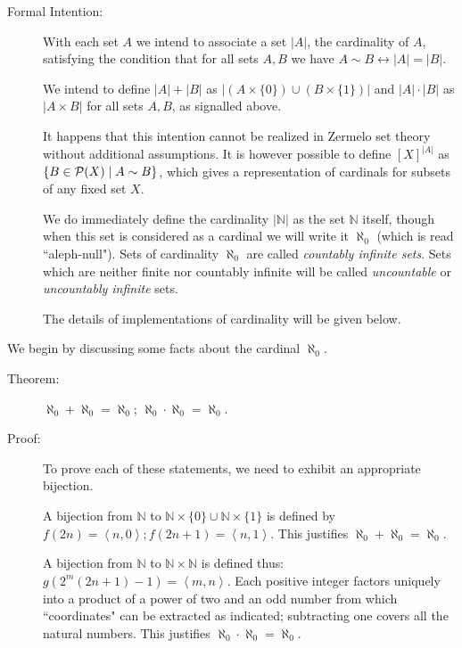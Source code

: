 \documentclass[12pt]{book}
\begin{document}
\begin{description}

\item[Formal Intention:]  With each set $A$ we intend to associate a set $|A|$, the cardinality of $A$, satisfying the condition that for
all sets $A,B$ we have $A \sim B \leftrightarrow |A|=|B|$.

We intend to define $|A|+|B|$ as $|(A \times \{0\}) \cup (B \times \{1\})|$ and $|A|\cdot |B|$ as $|A \times B|$ for all sets $A,B$, as signalled above.

It happens that this intention cannot be realized in Zermelo set theory without additional assumptions.  It is however possible to define
$[X]^{|A|}$ as $\{B \in {\cal P}(X) \mid A \sim B\}$, which gives a representation of cardinals for subsets of any fixed set $X$.

We do immediately define the cardinality $|\mathbb N|$ as the set $\mathbb N$ itself, though when this set is considered as a cardinal we will write it $\aleph_0$ (which is read ``aleph-null").  Sets of cardinality $\aleph_0$ are called {\em countably infinite sets\/}.  Sets which are neither finite nor countably infinite will be called {\em uncountable\/} or {\em uncountably infinite\/} sets.

The details of implementations of cardinality will be given below.

\end{description}

We begin by discussing some facts about the cardinal $\aleph_0$.

\begin{description}


\item[Theorem:]  $\aleph_0 + \aleph_0 = \aleph_0$;  $\aleph_0\cdot \aleph_0 = \aleph_0$.

\item[Proof:]  To prove each of these statements, we need to exhibit an appropriate bijection.

A bijection from $\mathbb N$ to ${\mathbb N}\times \{0\} \cup {\mathbb N} \times \{1\}$ is defined by $f(2n) = \left<n,0\right>; f(2n+1) = \left<n,1\right>$.  This justifies $\aleph_0 + \aleph_0 = \aleph_0$.

A bijection from $\mathbb N$ to ${\mathbb N} \times {\mathbb N}$ is defined thus:  $g(2^m(2n+1)-1) = \left<m,n\right>$.  Each positive integer factors uniquely into a product of a power of two and an odd number from which ``coordinates" can be extracted as indicated;  subtracting one covers all the natural numbers.  This justifies $\aleph_0\cdot \aleph_0 = \aleph_0$.

\end{description}
\end{document}
